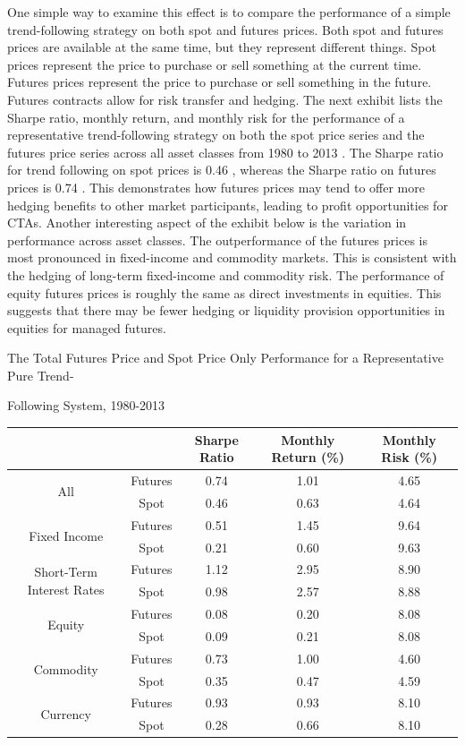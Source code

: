 \documentclass[11pt]{article}
\begin{document}
One simple way to examine this effect is to compare the performance of a simple trend-following strategy on both spot and futures prices. Both spot and futures prices are available at the same time, but they represent different things. Spot prices represent the price to purchase or sell something at the current time. Futures prices represent the price to purchase or sell something in the future. Futures contracts allow for risk transfer and hedging. The next exhibit lists the Sharpe ratio, monthly return, and monthly risk for the performance of a representative trend-following strategy on both the spot price series and the futures price series across all asset classes from 1980 to 2013 . The Sharpe ratio for trend following on spot prices is 0.46 , whereas the Sharpe ratio on futures prices is 0.74 . This demonstrates how futures prices may tend to offer more hedging benefits to other market participants, leading to profit opportunities for CTAs. Another interesting aspect of the exhibit below is the variation in performance across asset classes. The outperformance of the futures prices is most pronounced in fixed-income and commodity markets. This is consistent with the hedging of long-term fixed-income and commodity risk. The performance of equity futures prices is roughly the same as direct investments in equities. This suggests that there may be fewer hedging or liquidity provision opportunities in equities for managed futures.

The Total Futures Price and Spot Price Only Performance for a Representative Pure Trend-

Following System, 1980-2013

\begin{center}
\begin{tabular}{|c|c|c|c|c|}
\hline
 &  & Sharpe Ratio & Monthly Return (\%) & Monthly Risk (\%) \\
\hline
\multirow[t]{2}{*}{All} & Futures & 0.74 & 1.01 & 4.65 \\
\hline
 & Spot & 0.46 & 0.63 & 4.64 \\
\hline
\multirow[t]{2}{*}{Fixed Income} & Futures & 0.51 & 1.45 & 9.64 \\
\hline
 & Spot & 0.21 & 0.60 & 9.63 \\
\hline
\multirow[t]{2}{*}{Short-Term Interest Rates} & Futures & 1.12 & 2.95 & 8.90 \\
\hline
 & Spot & 0.98 & 2.57 & 8.88 \\
\hline
\multirow[t]{2}{*}{Equity} & Futures & 0.08 & 0.20 & 8.08 \\
\hline
 & Spot & 0.09 & 0.21 & 8.08 \\
\hline
\multirow[t]{2}{*}{Commodity} & Futures & 0.73 & 1.00 & 4.60 \\
\hline
 & Spot & 0.35 & 0.47 & 4.59 \\
\hline
\multirow[t]{2}{*}{Currency} & Futures & 0.93 & 0.93 & 8.10 \\
\hline
 & Spot & 0.28 & 0.66 & 8.10 \\
\hline
\end{tabular}
\end{center}
\end{document}
